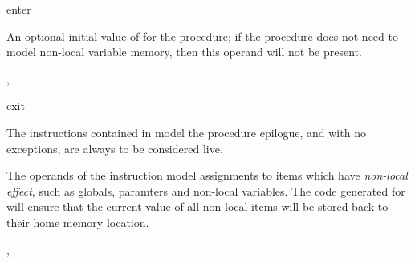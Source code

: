 \begin{instruction}{enter}
\begin{results}
  \end{results}

  \begin{operands}
  \item An optional initial value of  for the procedure;
    if the procedure does not need to model non-local variable memory,
    then this operand will not be present.
  \end{operands}

  \begin{seealso}
    , 
  \end{seealso}
\end{instruction}

\begin{instruction}{exit}

  \begin{notes}
    The instructions contained in  model the procedure
    epilogue, and with no exceptions, are always to be considered
    live.

    The operands of the  instruction model assignments
    to items which have \emph{non-local effect}, such as globals,
    \byref paramters and non-local variables.  The code generated for
     will ensure that the current value of all non-local
    items will be stored back to their home memory location.
  \end{notes}

  \nresults


  \begin{seealso}
    , 
  \end{seealso}
\end{instruction}

